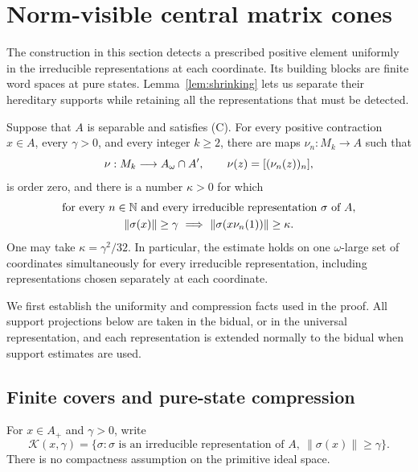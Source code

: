 \section{Norm-visible central matrix cones}\label{norm:section}

The construction in this section detects a prescribed positive element
uniformly in the irreducible representations at each coordinate.  Its
building blocks are finite word spaces at pure states.  Lemma~\ref{lem:shrinking}
lets us separate their hereditary supports while retaining all the
representations that must be detected.

\begin{proposition}\label{prop:norm}
Suppose that \(A\) is separable and satisfies \textup{(C)}.  For every positive contraction \(x\in A\), every
\(\gamma>0\), and every integer \(k\ge2\), there are \cpc maps
\(\nu_n:M_k\to A\) such that
\[
 \nu:M_k\longrightarrow A_\omega\cap A',
 \qquad \nu(z)=[(\nu_n(z))_n],
\]
is order zero, and there is a number \(\kappa>0\) for which
\begin{equation}\label{norm:coordinate-visibility}
 \begin{gathered}
 \text{for every }n\in\mathbb N\text{ and every irreducible representation }\sigma
 \text{ of }A,\\
 \|\sigma(x)\|\ge\gamma
 \ \Longrightarrow\
 \|\sigma(x\nu_n(1))\|\ge\kappa .
 \end{gathered}
\end{equation}
One may take \(\kappa=\gamma^2/32\).  In particular, the estimate holds on
one \(\omega\)-large set of coordinates simultaneously for every
irreducible representation, including representations chosen separately
at each coordinate.
\end{proposition}

We first establish the uniformity and compression facts used in the proof.
All support projections below are taken in the bidual, or in the universal
representation, and each representation is extended normally to the
bidual when support estimates are used.

\subsection{Finite covers and pure-state compression}

For \(x\in A_+\) and \(\gamma>0\), write
\[
 \mathcal K(x,\gamma)
   =\{\sigma:\sigma\text{ is an irreducible representation of }A,\
                    \|\sigma(x)\|\ge\gamma\}.
\]
There is no compactness assumption on the primitive ideal space.

